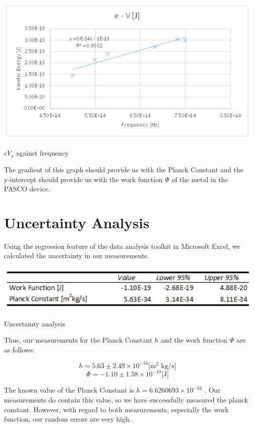\documentclass{article}
\begin{document}
\begin{graph}[H]
  \includegraphics{./img/graph.pdf}
  \caption{$eV_s$ against frequency}
  \label{fig:graph}
\end{graph}

The gradient of this graph should provide us with the Planck Constant and the y-intercept should provide us with the work function $\Phi$ of the metal in the PASCO device.

\section{Uncertainty Analysis}

Using the regression feature of the data analysis toolkit in Microsoft Excel, we calculated the uncertainty in our measurements.

\begin{table}[h]
  \includegraphics{./img/table_uncertainty.pdf}
  \caption{Uncertainty analysis}
  \label{tb:uncertainty}
\end{table}

Thus, our measurements for the Planck Constant $h$ and the work function $\Phi$ are as follows:

$$
h = 5.63 \pm 2.49 \times 10^{-34} \text{[m$^2$ kg/s]}
$$
$$
\Phi = -1.10 \pm 1.58 \times 10^{-19} \text{[J]}
$$

The known value of the Planck Constant is $h = 6.6260693 \times 10^{-34}$ \autocite{mohr_2016}. Our measurements do contain this value, so we have successfully measured the planck constant. However, with regard to both measurements, especially the work function, our random errors are very high.
\end{document}

